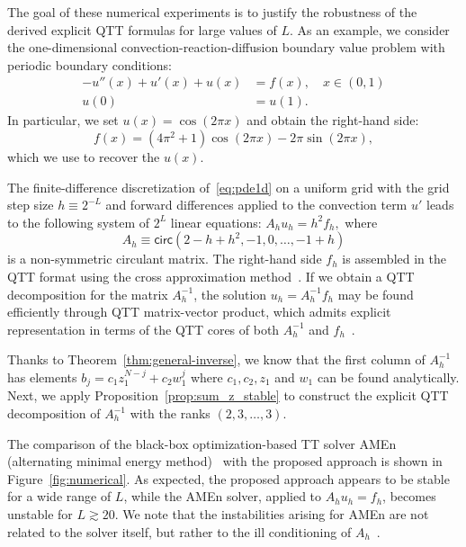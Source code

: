 \documentclass[a4paper]{article}
\newcommand{\LL}{L}
\begin{document}
The goal of these numerical experiments is to justify the robustness of the derived explicit QTT formulas for large values of $\LL$. 
As an example, we consider the one-dimensional convection-reaction-diffusion boundary value problem with periodic boundary conditions:
\begin{equation}\label{eq:pde1d}
\begin{aligned}
    -u''(x) + u'(x) + u(x) &= f(x),\quad x\in (0,1) \\
    u(0) &= u(1).
\end{aligned}
\end{equation}
In particular, we set $u(x) = \cos (2\pi x)$ and obtain the right-hand side: \[f(x) = (4\pi^2+1) \cos (2\pi x) - 2\pi \sin (2\pi x),\]
which we use to recover the $u(x)$.

The finite-difference discretization of~\eqref{eq:pde1d} on a uniform grid with the grid step size $h \equiv 2^{-\LL}$ and forward differences applied to the convection term $u'$ leads to the following system of $2^L$ linear equations: 
$
A_h u_h = h^2 f_h,
$
where
\[
A_h \equiv \mathsf{circ}(2-h+h^2, -1, 0, \dots, -1+h)
\]
is a non-symmetric circulant matrix.
The right-hand side $f_h$ is assembled in the QTT format using the cross approximation method~\cite{ot-ttcross-2010}.
If we obtain a QTT decomposition for the matrix $A_h^{-1}$, the solution $u_h = A_h^{-1} f_h$ may be found efficiently through QTT matrix-vector product, which admits explicit representation in terms of the QTT cores of both $A_h^{-1}$ and $f_h$~\cite{osel-tt-2011}.

Thanks to Theorem~\ref{thm:general-inverse}, we know that the first column of $A_h^{-1}$ has elements $b_j = c_1z_1^{N-j} + c_2w_1^{j}$ where $c_1, c_2, z_1$ and $w_1$ can be found analytically.
Next, we apply Proposition~\ref{prop:sum_z_stable} to construct the explicit QTT decomposition of $A_h^{-1}$ with the ranks $(2,3,\dots,3)$.


The comparison of the black-box optimization-based TT solver AMEn (alternating minimal energy method)~\cite{ds-amen-2014} with the proposed approach is shown in Figure~\ref{fig:numerical}.
As expected, the proposed approach appears to be stable for a wide range of $\LL$, while the AMEn solver, applied to $A_h u_h = f_h$, becomes unstable for $\LL\gtrsim 20$.
We note that the instabilities arising for AMEn are not related to the solver itself, but rather to the ill conditioning of $A_h$~.
\end{document}
